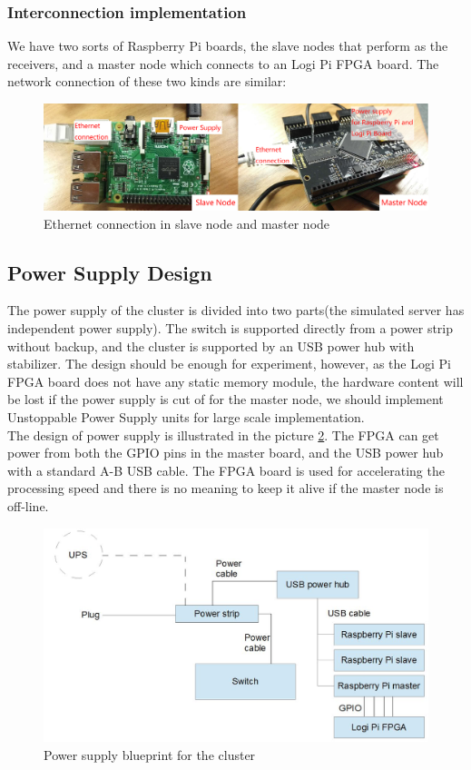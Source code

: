 \documentclass[11pt,openright,a4paper]{report}
\begin{document}
\subsubsection{Interconnection implementation}
We have two sorts of Raspberry Pi boards, the slave nodes that perform as the receivers, and a master node which connects to an Logi Pi FPGA board. The network connection of these two kinds are similar:
\begin{figure}[H]
\centering
\includegraphics[width=0.9\linewidth]{picture/photo/rappCluster}
\caption{Ethernet connection in slave node and master node}
\label{fig:rappCluster}
\end{figure}
\subsection{Power Supply Design}
The power supply of the cluster is divided into two parts(the simulated server has independent power supply). The switch is supported directly from a power strip without backup, and the cluster is supported by an USB power hub with stabilizer. The design should be enough for experiment, however, as the Logi Pi FPGA board does not have any static memory module, the hardware content will be lost if the power supply is cut of for the master node, we should implement Unstoppable Power Supply units for large scale implementation.\\
The design of power supply is illustrated in the picture \ref{fig:powerDesign}. The FPGA can get power from both the GPIO pins in the master board, and the USB power hub with a standard A-B USB cable. The FPGA board is used for accelerating the processing speed and there is no meaning to keep it alive if the master node is off-line.\\
\begin{figure}[H]
\centering
\includegraphics[width=0.7\linewidth]{picture/powerDesign}
\caption{Power supply blueprint for the cluster}
\label{fig:powerDesign}
\end{figure}
\end{document}
